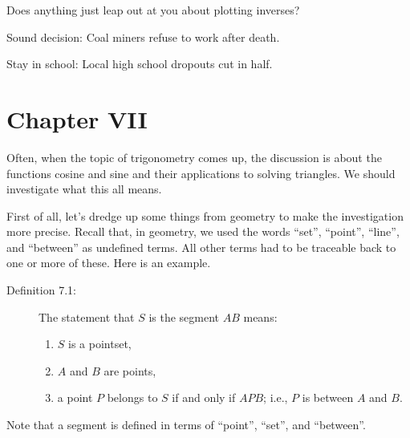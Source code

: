 \documentclass[english]{book}
\begin{document}
Does anything just leap out at you about plotting inverses?


\vspace{2cm}

\begin{center}
Sound decision: Coal miners refuse to work after death.
\vspace{0.5cm}

Stay in school: Local high school dropouts cut in half.
\end{center}



\chapter*{Chapter VII}


Often, when the topic of trigonometry comes up, the discussion is about the functions cosine and sine and their applications to solving triangles. We should investigate what this all means.

First of all, let's dredge up some things from geometry to make the investigation more precise. Recall that, in geometry, we used the words ``set'', ``point'', ``line'', and ``between'' as undefined terms. All other terms had to be traceable back to one or more of these. Here is an example.

\begin{description}

\item[Definition 7.1:] The statement that $S$ is the segment $AB$ means:
  \begin{enumerate}[\hspace{1cm}1)]
    \item $S$ is a pointset,
    \item $A$ and $B$ are points,
    \item a point $P$ belongs to $S$ if and only if $APB$; i.e., $P$ is between $A$ and $B$.
  \end{enumerate}

\end{description}

Note that a segment is defined in terms of ``point'', ``set'', and ``between''.
\end{document}
